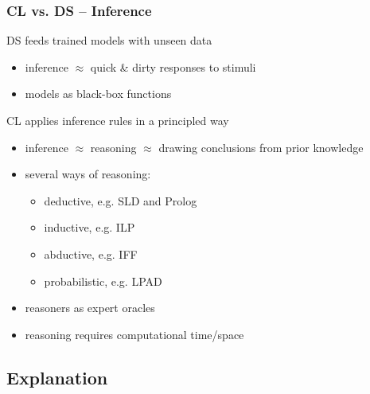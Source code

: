 \documentclass[presentation]{beamer}\mode<presentation>{\usetheme{AMSBolognaFC}}
\begin{document}
\begin{frame}%
    \frametitle{CL vs. DS -- Inference}

    \begin{block}{DS feeds trained models with unseen data}
        \begin{itemize}
            \item \alert{inference} $\approx$ quick \& dirty responses to stimuli
            \item models as black-box functions
        \end{itemize}
    \end{block}

    \begin{block}{CL applies inference rules in a principled way}
        \begin{itemize}
            \item \alert{inference} $\approx$ reasoning $\approx$ drawing conclusions from prior knowledge 
            \item several ways of reasoning:
            \begin{itemize}
                \item deductive, e.g. SLD and Prolog
                \item inductive, e.g. ILP
                \item abductive, e.g. IFF
                \item probabilistic, e.g. LPAD 
            \end{itemize}
            \item reasoners as expert oracles 
            \item reasoning requires computational time/space
        \end{itemize}
    \end{block}
\end{frame}

\subsection{Explanation}
\end{document}
